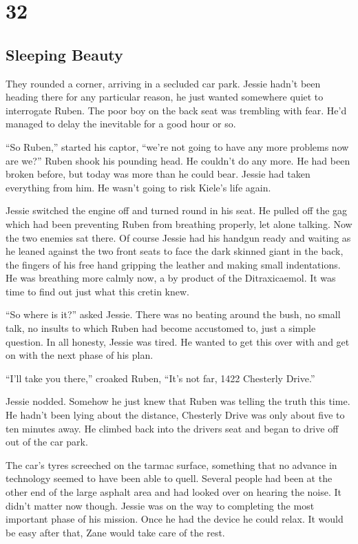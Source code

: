 \chapter{32}
\section{Sleeping Beauty}


They rounded a corner, arriving in a secluded car park.  Jessie hadn't been heading there for any particular reason, he just wanted somewhere quiet to interrogate Ruben.  The poor boy on the back seat was trembling with fear.  He'd managed to delay the inevitable for a good hour or so.

``So Ruben,'' started his captor, ``we're not going to have any more problems now are we?''  Ruben shook his pounding head.  He couldn't do any more.  He had been broken before, but today was more than he could bear.  Jessie had taken everything from him.  He wasn't going to risk Kiele's life again.

Jessie switched the engine off and turned round in his seat.  He pulled off the gag which had been preventing Ruben from breathing properly, let alone talking.  Now the two enemies sat there.  Of course Jessie had his handgun ready and waiting as he leaned against the two front seats to face the dark skinned giant in the back, the fingers of his free hand gripping the leather and making small indentations.  He was breathing more calmly now, a by product of the Ditraxicaemol.  It was time to find out just what this cretin knew.

``So where is it?'' asked Jessie.  There was no beating around the bush, no small talk, no insults to which Ruben had become accustomed to, just a simple question.  In all honesty, Jessie was tired.  He wanted to get this over with and get on with the next phase of his plan.

``I'll take you there,'' croaked Ruben, ``It's not far, 1422 Chesterly Drive.''

Jessie nodded.  Somehow he just knew that Ruben was telling the truth this time.  He hadn't been lying about the distance, Chesterly Drive was only about five to ten minutes away.  He climbed back into the drivers seat and began to drive off out of the car park.

The car's tyres screeched on the tarmac surface, something that no advance in technology seemed to have been able to quell.  Several people had been at the other end of the large asphalt area and had looked over on hearing the noise.  It didn't matter now though.  Jessie was on the way to completing the most important phase of his mission.  Once he had the device he could relax.  It would be easy after that, Zane would take care of the rest.  

